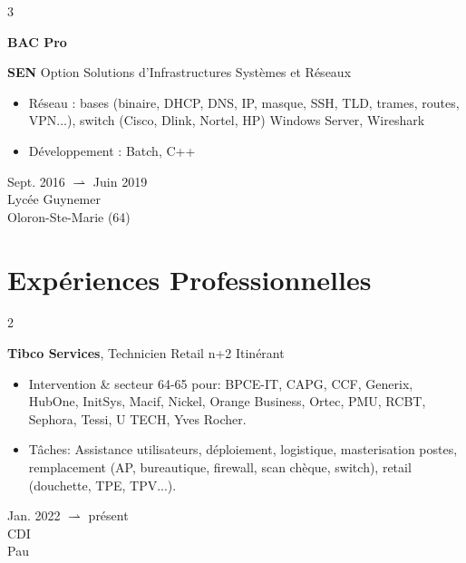 \documentclass[11pt, a4paper]{article}
\newenvironment{highlights}{
    \begin{itemize}[
        topsep=0.10 cm,
        parsep=0.10 cm,
        partopsep=0pt,
        itemsep=0pt,
        leftmargin=0.4 cm + 10pt
    ]
}{
    \end{itemize}
} %
\newenvironment{twocolentry}[2][]{
    \onecolentry
    \def\secondColumn{#2}
    \setcolumnwidth{\fill, 4.5 cm}
    \begin{paracol}{2}
}{
    \switchcolumn \raggedleft \secondColumn
    \end{paracol}
    \endonecolentry
} %
\newenvironment{threecolentry}[3][]{
    \onecolentry
    \def\thirdColumn{#3}
    \setcolumnwidth{1 cm, \fill, 4.5 cm}
    \begin{paracol}{3}
    {\raggedright #2} \switchcolumn
}{
    \switchcolumn \raggedleft \thirdColumn
    \end{paracol}
    \endonecolentry
} %
\let\hrefWithoutArrow\href
\renewcommand{\href}[2]{\hrefWithoutArrow{#1}{\ifthenelse{\equal{#2}{}}{ }{#2 }\raisebox{.15ex}{\footnotesize \faExternalLink*}}}
\begin{document}
        \vspace{0.2 cm}


        \begin{threecolentry}{\textbf{BAC Pro}}{
            Sept. 2016 $ \rightharpoonup $ Juin 2019 \\
            Lycée Guynemer \\
            Oloron-Ste-Marie (64)
        }
            \textbf{SEN} Option Solutions d'Infrastructures Systèmes et Réseaux
            \begin{highlights}
                \item Réseau : bases (binaire, DHCP, DNS, IP, masque, SSH, TLD, trames, routes, VPN...), switch (Cisco, Dlink, Nortel, HP) Windows Server, Wireshark
                \item  Développement : Batch, C++
            \end{highlights}
        \end{threecolentry}

    
    \section{Expériences Professionnelles}

        
        \begin{twocolentry}{
            Jan. 2022 $ \rightharpoonup $ présent \\
            CDI \\
            Pau
        }
            \textbf{Tibco Services}, Technicien Retail n+2 Itinérant 
            \begin{highlights}
                \item Intervention \href{https://w.wiki/D3ur}{IMAC} \& \href{https://w.wiki/D3uh}{MCO} secteur 64-65 pour: BPCE-IT, CAPG, CCF, Generix, HubOne, InitSys, Macif, Nickel, Orange Business, Ortec, PMU, RCBT, Sephora, Tessi, U TECH, Yves Rocher.
                \item Tâches: Assistance utilisateurs, déploiement, logistique, masterisation postes, remplacement (AP, bureautique, firewall, scan chèque, switch), retail (douchette, TPE, TPV...).
            \end{highlights}
        \end{twocolentry}
\end{document}
